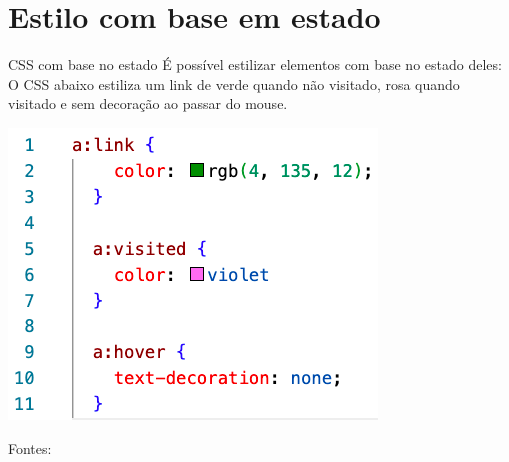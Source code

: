 \documentclass{beamer}
\begin{document}
\section{Estilo com base em estado}
\begin{frame}{CSS com base no estado}
É possível estilizar elementos com base no estado deles:\\
O CSS abaixo estiliza um link de verde quando não visitado, rosa quando visitado e sem decoração ao passar do mouse.
\begin{center}
		  \includegraphics[height=0.4\paperheight]{fig/aula2/css_estado.png} \\
	  \end{center}
 \tiny Fontes: \cite{mdn2023}
\end{frame}

\end{document}
